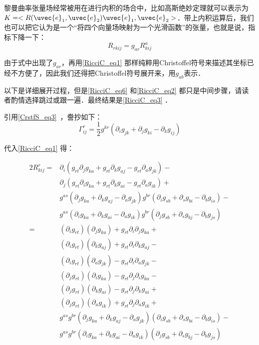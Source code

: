 黎曼曲率张量场经常被用在进行内积的场合中，比如高斯绝妙定理就可以表示为$K=<R(\uvec{e}_1, \uvec{e}_2)\uvec{e}_1, \uvec{e}_2>$．带上内积运算后，我们也可以把它认为是一个“将四个向量场映射为一个光滑函数”的张量，也就是说，指标下降一下：
\begin{equation}
R_{rkij}=g_{ar}R^a_{kij}
\end{equation}

由于式中出现了$g_{ar}$，再用\autoref{RicciC_eq1} 那样纯粹用Christoffel符号来描述其坐标已经不方便了，因此我们还得把Christoffel符号展开来，用$g_{ab}$表示．

以下是详细展开过程，但是\autoref{RicciC_eq6} 和\autoref{RicciC_eq2} 都只是中间步骤，请读者酌情选择跳过或跟一遍．最终结果是\autoref{RicciC_eq3} ．

引用\autoref{CrstfS_eq3}~，誊抄如下：
\begin{equation}
\Gamma^{r}_{ij}=\frac{1}{2}g^{kr}(\partial_ig_{jk}+\partial_jg_{ki}-\partial_kg_{ij})
\end{equation}

代入\autoref{RicciC_eq1} 得：

\begin{equation}\label{RicciC_eq6}
\begin{aligned}
2R^r_{kij}=&\partial_i(g_{rt}\partial_jg_{ka}+g_{rt}\partial_kg_{aj}-g_{rt}\partial_ag_{jk})-\\
&\partial_j(g_{rt}\partial_ig_{ka}+g_{rt}\partial_kg_{ai}-g_{rt}\partial_ag_{ik})+\\
&g^{as}(\partial_jg_{ka}+\partial_kg_{aj}-\partial_ag_{jk})g^{br}(\partial_ig_{sb}+\partial_sg_{bi}-\partial_bg_{is})-\\
&g^{as}(\partial_ig_{ka}+\partial_kg_{ai}-\partial_ag_{ik})g^{br}(\partial_jg_{sb}+\partial_sg_{bj}-\partial_bg_{js})\\
=&(\partial_ig_{rt})(\partial_jg_{ka})+g_{rt}\partial_i\partial_jg_{ka}+\\
&(\partial_ig_{rt})(\partial_kg_{aj})+g_{rt}\partial_i\partial_kg_{aj}-\\
&(\partial_ig_{rt})(\partial_ag_{jk})-g_{rt}\partial_i\partial_ag_{jk}-\\%
&(\partial_jg_{rt})(\partial_ig_{ka})-g_{rt}\partial_j\partial_ig_{ka}-\\
&(\partial_jg_{rt})(\partial_kg_{ai})-g_{rt}\partial_j\partial_kg_{ai}+\\
&(\partial_jg_{rt})(\partial_ag_{ik})+g_{rt}\partial_j\partial_ag_{ik}+\\%
&g^{as}g^{br}(\partial_jg_{ka}+\partial_kg_{aj}-\partial_ag_{jk})(\partial_ig_{sb}+\partial_sg_{bi}-\partial_bg_{is})-\\
&g^{as}g^{br}(\partial_ig_{ka}+\partial_kg_{ai}-\partial_ag_{ik})(\partial_jg_{sb}+\partial_sg_{bj}-\partial_bg_{js})
\end{aligned}
\end{equation}

